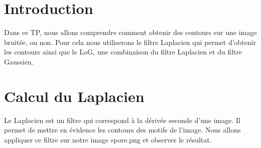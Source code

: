 \documentclass[a4paper,12pt]{report}
\begin{document}


\setcounter{page}{1} 
\newpage

\section*{Introduction}

Dans ce TP, nous allons comprendre comment obtenir des contours sur une image bruitée, ou non. Pour cela nous utiliserons le filtre Laplacien qui permet d'obtenir les contours ainsi que le LoG, une combinaison du filtre Laplacien et du filtre Gaussien.








\section*{Calcul du Laplacien}

Le Laplacien est un filtre qui correspond à la dérivée seconde d'une image. 
Il permet de mettre en évidence les contours des motifs de l'image. Nous allons appliquer ce filtre sur notre image spore.png et observer le résultat.
\end{document}
